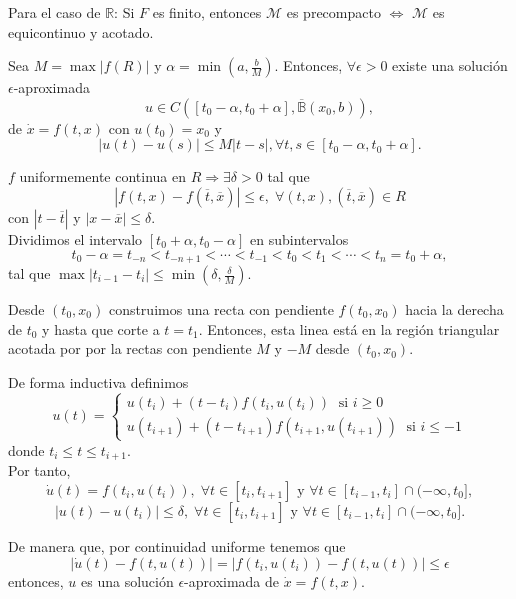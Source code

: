 \begin{obs}
  Para el caso de $\mathbb{R}$: Si $F$ es finito, entonces $\mathcal{M}$ es precompacto $\Leftrightarrow$ $\mathcal{M}$ es equicontinuo y acotado.
\end{obs}

\begin{lem}
  Sea $M = \max | f(R) |$ y $ \alpha = \min(a, \frac{b}{M})$. Entonces, $\forall \epsilon >0$ existe una solución $\epsilon$-aproximada
  \[ 
    u \in C([t_{0} - \alpha, t_{0} + \alpha], \overline{\mathbb{B}}(x_{0}, b)) ,
  \] 
  de $\dot{x} = f(t, x)$ con $u(t_{0}) = x_{0}$ y 
  \[ 
    | u(t) - u(s) | \leq M | t - s |, \forall t, s \in [t_{0} - \alpha, t_{0} + \alpha] .
  \] 
\end{lem}

\begin{dem}
  $f$ uniformemente continua en $R \Rightarrow \exists \delta >0$ tal que
  \[ 
    | f(t, x) - f(\overline{t}, \overline{x}) | \leq \epsilon, \; \forall (t,x),(\overline{t},\overline{x}) \in R 
  \] 
  con $|  t - \overline{t} |$ y $| x - \overline{x} | \leq \delta$. \\

  Dividimos el intervalo $[t_{0} + \alpha, t_{0} - \alpha]$ en subintervalos
  \[ 
    t_{0} - \alpha = t_{-n} < t_{-n+1} < \cdots < t_{-1} < t_{0} < t_{1} < \cdots < t_{n} = t_{0} + \alpha,
  \] 
  tal que $\max | t_{i-1} - t_{i} | \leq \min(\delta, \frac{\delta}{M})$.

  Desde $(t_{0}, x_{0})$ construimos una recta con pendiente $f(t_{0}, x_{0})$ hacia la derecha de $t_{0}$ y hasta que corte a $t = t_{1}$. Entonces, esta linea está en la región triangular acotada por por la rectas con pendiente $M$ y $-M$ desde $(t_{0}, x_{0})$.

  De forma inductiva definimos
  \[ 
    u(t) =
    \begin{cases}
      u(t_{i}) + (t - t_{i})f(t_{i}, u(t_{i})) \; \text{ si } i \geq 0 \\
      u(t_{i+1}) + (t - t_{i+1})f(t_{i+1}, u(t_{i+1})) \; \text{ si } i \leq -1
    \end{cases} 
  \] 
  donde $t_{i} \leq t \leq t_{i+1}$.\\

  Por tanto,
  \[
    \dot{u}(t) = f(t_{i}, u(t_{i})), \;   \forall t \in [t_{i}, t_{i+1}] \text{ y }\forall t \in [t_{i-1}, t_{i}] \cap (-\infty, t_{0}],
  \]
  \[
    | u(t) - u(t_{i}) | \leq \delta,  \; \forall t \in [t_{i}, t_{i+1}] \text{ y } \forall t \in [t_{i-1}, t_{i}] \cap (-\infty, t_{0}]. 
  \]

  De manera que, por continuidad uniforme tenemos que
  \[ 
    | \dot{u}(t) - f(t, u(t)) | = | f(t_{i}, u(t_{i})) - f(t, u(t))| \leq \epsilon
  \] 
  entonces, $u$ es una solución $\epsilon$-aproximada de $\dot{x} = f(t, x)$.
\end{dem}

